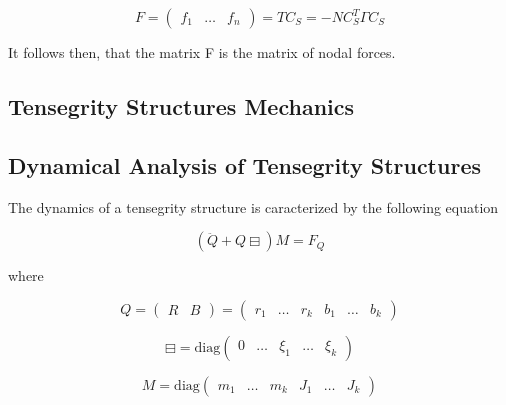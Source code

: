     \begin{equation}
        F =
        \begin{pmatrix}
            f_1 & \dots & f_n
        \end{pmatrix} = T C_S = - N C_S^T \Gamma C_S
    \end{equation}

    It follows then, that the matrix F is the matrix of nodal forces.

\subsection{Tensegrity Structures Mechanics}

\subsection{Dynamical Analysis of Tensegrity Structures}

    The dynamics of a tensegrity structure is caracterized by the following equation

    \begin{equation}
        \left( \ddot{Q} + Q \boxminus \right) M = F_Q
    \end{equation}

    where

    \begin{equation}
        Q =
        \begin{pmatrix}
            R & B
        \end{pmatrix} =
        \begin{pmatrix}
            r_1 & \dots & r_k & b_1 & \dots & b_k
        \end{pmatrix}
    \end{equation}

    \begin{equation}
        \boxminus = \text{diag}
        \begin{pmatrix}
            0 & \dots & \xi_1 & \dots & \xi_k
        \end{pmatrix}
    \end{equation}

    \begin{equation}
        M = \text{diag}
        \begin{pmatrix}
            m_1 & \dots & m_k & J_1 & \dots & J_k
        \end{pmatrix}
    \end{equation}

